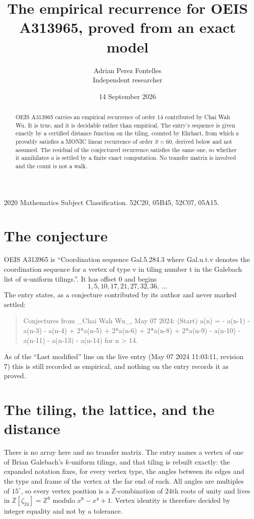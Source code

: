 \documentclass[11pt,a4paper]{article}
\title{The empirical recurrence for OEIS A313965, proved from an exact model}
\author{Adrian Perez Fontelles\\ \small Independent researcher}
\date{14 September 2026}
\theoremstyle{plain}
\theoremstyle{definition}
\begin{document}
\maketitle

\begin{abstract}
OEIS A313965 carries an empirical recurrence of order $14$ contributed by Chai Wah Wu. It is true, and it is
decidable rather than empirical. The entry's sequence is given exactly by a certified distance function on the tiling, counted by Ehrhart, from
which $a$ provably satisfies a MONIC linear recurrence of order $S=60$, derived below and not
assumed. The residual of the conjectured recurrence satisfies the same one, so whether it
annihilates $a$ is settled by a finite exact computation. No transfer matrix is involved and the count is not a walk.
\end{abstract}

\noindent\small 2020 Mathematics Subject Classification. 52C20, 05B45, 52C07, 05A15.\normalsize

\section{The conjecture}

OEIS A313965 is ``Coordination sequence Gal.5.284.3 where Gal.u.t.v denotes the coordination sequence for a vertex of type v in tiling number t in the Galebach list of u-uniform tilings.''. It has offset $0$ and begins
\[
1, 5, 10, 17, 21, 27, 32, 36,\ \dots
\]
The entry states, as a conjecture contributed by its author and never marked settled:
\begin{quote}
Conjectures from \_Chai Wah Wu\_, May 07 2024: (Start) a(n) = - a(n-1) - a(n-3) - a(n-4) + 2*a(n-5) + 2*a(n-6) + 2*a(n-8) + 2*a(n-9) - a(n-10) - a(n-11) - a(n-13) - a(n-14) for n > 14.
\end{quote}
As of the ``Last modified'' line on the live entry (May 07 2024 11:03:11, revision 7)
this is still recorded as empirical, and nothing on the entry records it as proved.

\section{The tiling, the lattice, and the distance}

There is no array here and no transfer matrix. The entry names a vertex of one of Brian
Galebach's $k$-uniform tilings, and that tiling is rebuilt exactly: the expanded notation
fixes, for every vertex type, the angles between its edges and the type and frame of the
vertex at the far end of each. All angles are multiples of $15^\circ$, so every vertex
position is a $\mathbb{Z}$-combination of $24$th roots of unity and lives in
$\mathbb{Z}[\zeta_{24}]=\mathbb{Z}^{8}$ modulo $x^{8}-x^{4}+1$. Vertex identity is
therefore decided by integer equality and not by a tolerance.
\end{document}
